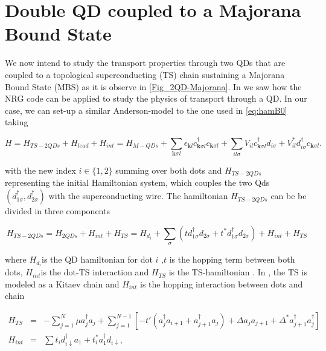 \chapter{Double QD coupled to a Majorana Bound State}





We now intend to study the transport properties through two QDs that
are coupled to a topological superconducting (TS) chain sustaining
a Majorana Bound State (MBS) as it is observe in \ref{Fig_2QD-Majorana}.
In  we saw how the NRG
code can be applied to study the physics of transport through a QD.
In our case, we can set-up a similar Anderson-model to the one used
in \ref{eq:hamB0} taking

\[
H=H_{TS-2QDs}+H_{lead}+H_{int}=H_{M-QDs}+\sum_{\mathbf{k}\sigma l}\epsilon_{\mathbf{k}l}c_{\mathbf{k}\sigma l}^{\dagger}c_{\mathbf{k}\sigma l}+\sum_{il\sigma}V_{il}c_{\mathbf{k}\sigma l}^{\dagger}d_{i\sigma}+V_{il}^{*}d_{i\sigma}^{\dagger}c_{\mathbf{k}\sigma l}.
\]


with the new index $i\in\{1,2\}$ summing over both dots and $H_{TS-2QDs}$
representing the initial Hamiltonian system, which couples the two
Qds $\left(d_{1\sigma}^{\dagger},d_{2\sigma}^{\dagger}\right)$ with
the superconducting wire. The hamiltonian $H_{TS-2QDs}$ can be be
divided in three components

\[
H_{TS-2QDs}=H_{2QDs}+H_{int}+H_{TS}=H_{d_{i}}+\sum_{\sigma}\left(td_{1\sigma}^{\dagger}d_{2\sigma}+t^{*}d_{1\sigma}^{\dagger}d_{2\sigma}\right)+H_{int}+H_{TS}
\]


where $H_{d_{i}}$is the QD hamiltonian for dot $i$ 
,$t$ is the hopping term between both dots, $H_{int}$is the dot-TS
interaction and $H_{TS}$ is the TS-hamiltonian . In \citep{vernek_subtle_2014},
the TS is modeled as a Kitaev chain \citep{kitaev_unpaired_2001}
and $H_{int}$ is the hopping interaction between dots and chain 

\begin{eqnarray}
H_{TS} & = & -\sum_{j=1}^{N}\mu a_{j}^{\dagger}a_{j}+\sum_{j=1}^{N-1}\left[-t'(a_{j}^{\dagger}a_{i+1}+a_{j+1}^{\dagger}a_{j})+\Delta a_{j}a_{j+1}+\Delta^{*}a_{j+1}^{\dagger}a_{j}^{\dagger}\right]\nonumber \\
H_{int} & = & \sum t_{i}d_{i\downarrow}^{\dagger}a_{1}+t_{i}^{*}a_{1}^{\dagger}d_{i\downarrow},\label{eq:Kitaev-dot}
\end{eqnarray}


